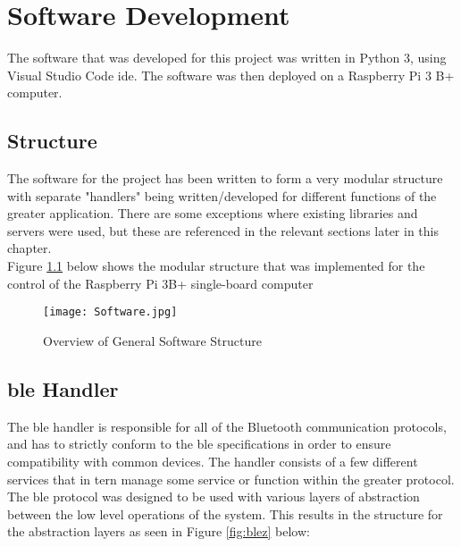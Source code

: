 
\chapter{Software Development}
The software that was developed for this project was written in Python 3, using Visual Studio Code \ac{ide}. The software was then deployed on a Raspberry Pi 3 B+ computer. 

\newpage

\section{Structure}

The software for the project has been written to form a very modular structure with separate "handlers" being written/developed for different functions of the greater application. There are some exceptions where existing libraries and servers were used, but these are referenced in the relevant sections later in this chapter.\\
Figure \ref{fig:soft} below shows the modular structure that was implemented for the control of the Raspberry Pi 3B+ single-board computer

\begin{figure}[h!]
	\begin{center}
		\texttt{[image: Software.jpg]}
		\caption{Overview of General Software Structure}
		\label{fig:soft}
	\end{center}
\end{figure}

\section{\ac{ble} Handler}
The \ac{ble} handler is responsible for all of the Bluetooth communication protocols, and has to strictly conform to the \ac{ble} specifications in order to ensure compatibility with common devices. The handler consists of a few different services that in tern manage some service or function within the greater protocol.\\
The \ac{ble} protocol was designed to be used with various layers of abstraction between the low level operations of the system. This results in the structure for the abstraction layers as seen in Figure \ref{fig:blez} below:

